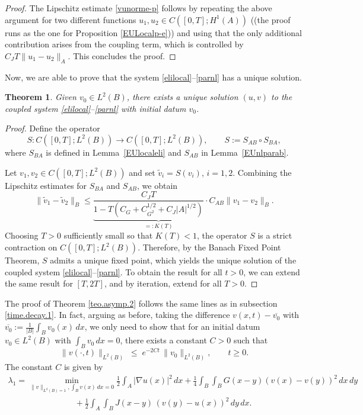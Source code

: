\documentclass[reqno]{amsart}
\numberwithin{equation}{section}
\newtheorem{theorem}{Theorem}[section]
\begin{document}
\begin{proof}[Proof]
The Lipschitz estimate \eqref{vunorme-p} follows by repeating the above
argument for two different functions $u_1,u_2\in C([0,T];H^1(A))$ ((the proof runs as the one for Proposition \eqref{EULocalp-e})) 
and using that the only additional contribution arises from the coupling term, which is
controlled by $C_JT\|u_1-u_2\|_A$. This concludes the proof.
\end{proof}

Now, we are able to prove that the system \eqref{elilocal}--\eqref{parnl} has a unique solution. 

\begin{theorem}
Given $v_0\in L^2(B)$, there exists a unique solution $(u,v)$ to the coupled
system \eqref{elilocal}--\eqref{parnl} with initial datum $v_0$.
\end{theorem}
\begin{proof}[Proof]
Define the operator
\[
S:C([0,T];L^2(B))\to C([0,T];L^2(B)),
\qquad
S:=S_{AB}\circ S_{BA},
\]
where $S_{BA}$ is defined in Lemma~\ref{EUlocaleli} and $S_{AB}$ in
Lemma~\ref{EUnlparab}.  

Let $v_1,v_2\in C([0,T];L^2(B))$ and set $\tilde v_i=S(v_i)$, $i=1,2$.
Combining the Lipschitz estimates for $S_{BA}$ and $S_{AB}$, we obtain
\[
\|\tilde v_1-\tilde v_2\|_B
\le
\underbrace{
\frac{C_JT}{1-T(C_G + C_{G^2}^{1/2}+C_J|A|^{1/2})}
\cdot
C_{AB}
}_{=:K(T)}
\|v_1-v_2\|_B.
\]
Choosing $T>0$ sufficiently small so that $K(T)<1$, the operator $S$ is a
strict contraction on $C([0,T];L^2(B))$. Therefore, by the Banach Fixed Point
Theorem, $S$ admits a unique fixed point, which yields the unique solution of the coupled system \eqref{elilocal}--\eqref{parnl}. To obtain the result for all $t>0$, we can extend the same result for $[T,2T]$, and by iteration, extend for all $T>0$.
\end{proof}

The proof of Theorem \ref{teo.asymp.2} follows the same lines as in subsection \ref{time.decay.1}.
In fact, arguing as before, taking the difference $v (x,t) - \overline{v_0}$ with $\overline{v_0} := \frac{1}{|B|} \int_B v_0(x)\,dx$, we only need to show that for
an initial datum $v_0\in L^2(B)$ with $\int_B v_0\,dx = 0$, 
there exists a constant $C>0$ such that
$$
\| v (\cdot,t)\|_{L^2(B)}
\;\le\;
e^{-2C t}\,\|v_0\|_{L^2(B)},
\qquad t\ge 0.
$$
The constant $C$ is given by
$$
\begin{array}{l}
\displaystyle
\lambda_1  = 
\min_{\| v \|_{L^2 (B)=1}, \int_B v (x) \, dx =0} 
 \frac12\int_A |\nabla u(x)|^2\,dx
  + \frac14 \int_B\!\int_B G(x-y)(v(x)-v(y))^2\,dx\,dy 
  \\[10pt]
  \qquad \qquad \qquad \qquad \displaystyle + \frac12\int_A\int_B J(x-y)\,(v(y)-u(x))^2\,dy\,dx.
  \end{array}
$$
\end{document}
